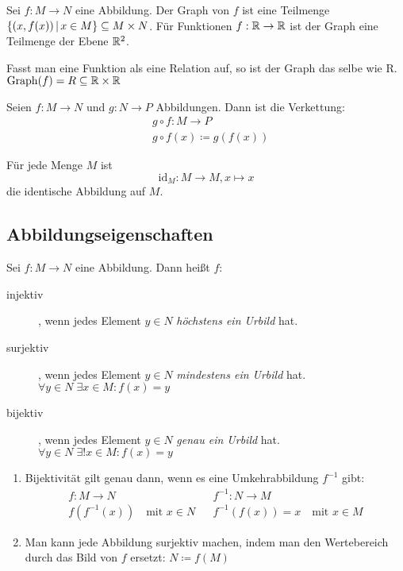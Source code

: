 Sei $f:M\rightarrow N$ eine Abbildung. Der Graph von $f$ ist eine Teilmenge $\left\{ (x,f(x)) \,\middle|\, x\in M \right\}\subseteq M\times N$.
Für Funktionen $f:\mathbb{R}\rightarrow\mathbb{R}$ ist der Graph eine Teilmenge der Ebene $\mathbb{R}^2$.

Fasst man eine Funktion als eine Relation auf, so ist der Graph das selbe wie R. $\mathrm{Graph}(f)=R\subseteq\mathbb{R}\times\mathbb{R}$

Seien $f:M\rightarrow N$ und $g:N\rightarrow P$ Abbildungen. Dann ist die Verkettung:
\begin{align*}
  &g\circ f:M\rightarrow P\\
  &g\circ f(x)\coloneqq g(f(x))
\end{align*}

Für jede Menge $M$ ist
\begin{equation*}
  \mathrm{id}_M:M\rightarrow M, x\mapsto x
\end{equation*}
die identische Abbildung auf $M$.

\subsection{Abbildungseigenschaften}
Sei $f:M\rightarrow N$ eine Abbildung. Dann heißt $f$:
\begin{description}
  \item[injektiv], wenn jedes Element $y\in N$ \emph{höchstens ein Urbild} hat.
  \item[surjektiv], wenn jedes Element $y\in N$ \emph{mindestens ein Urbild} hat. $\forall y\in N\; \exists x\in M : f(x) = y$
  \item[bijektiv], wenn jedes Element $y\in N$ \emph{genau ein Urbild} hat. $\forall y\in N\; \exists! x\in M : f(x) = y$
\end{description}

\bemerkung
\begin{enumerate}
  \item Bijektivität gilt genau dann, wenn es eine Umkehrabbildung $f^{-1}$ gibt:
  \begin{align*}
    f:M\rightarrow N && f^{-1}:N\rightarrow M\\
    f\left(f^{-1}(x)\right) \quad\text{mit }x\in N && f^{-1}\left(f(x)\right)=x \quad\text{mit }x\in M
  \end{align*}
  \item Man kann jede Abbildung surjektiv machen, indem man den Wertebereich durch das Bild von $f$ ersetzt: $N\coloneqq f(M)$
\end{enumerate}

